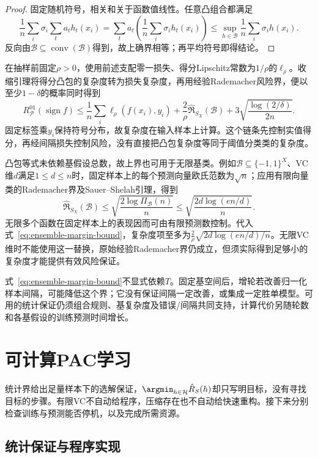 \begin{proof}
固定随机符号，相关和关于函数值线性。任意凸组合都满足
\[
 \frac1n\sum_i\sigma_i\sum_ta_th_t(x_i)
 =\sum_ta_t\left(\frac1n\sum_i\sigma_ih_t(x_i)\right)
 \leq\sup_{h\in\mathcal B}\frac1n\sum_i\sigma_ih(x_i).
\]
反向由$\mathcal B\subseteq\operatorname{conv}(\mathcal B)$得到，故上确界相等；再平均符号即得结论。
\end{proof}

在抽样前固定$\rho>0$，使用前述支配零一损失、得分Lipschitz常数为$1/\rho$的$\ell_\rho$。收缩引理将得分凸包的复杂度转为损失复杂度，再用经验Rademacher风险界，便以至少$1-\delta$的概率同时得到
\begin{equation}
 R_{\mathcal P}^{01}(\operatorname{sign}f)
 \leq\frac1n\sum_i\ell_\rho(f(x_i),y_i)
 +\frac{2}{\rho}\widehat{\mathfrak R}_{S_X}(\mathcal B)
 +3\sqrt{\frac{\log(2/\delta)}{2n}}.
 \label{eq:ensemble-margin-bound}
\end{equation}
固定标签乘$y_i$保持符号分布，故复杂度在输入样本上计算。这个链条先控制实值得分，再经间隔损失控制风险，没有直接把凸包复杂度等同于阈值分类类的复杂度。

凸包等式未依赖基假设总数，故上界也可用于无限基类。例如$\mathcal B\subseteq\{-1,1\}^X$、VC维$d$满足$1\leq d\leq n$时，固定样本上的每个预测向量欧氏范数为$\sqrt n$；应用有限向量类的Rademacher界及Sauer--Shelah引理，得到
\[
 \widehat{\mathfrak R}_{S_X}(\mathcal B)
 \leq\sqrt{\frac{2\log\Pi_{\mathcal B}(n)}{n}}
 \leq\sqrt{\frac{2d\log(en/d)}{n}}.
\]
无限多个函数在固定样本上的表现因而可由有限预测数控制。代入式~\eqref{eq:ensemble-margin-bound}，复杂度项至多为$\frac{2}{\rho}\sqrt{2d\log(en/d)/n}$。无限VC维时不能使用这一替换，原始经验Rademacher界仍成立，但须实际得到足够小的复杂度才能提供有效风险保证。

式~\eqref{eq:ensemble-margin-bound}不显式依赖$T$。固定基空间后，增轮若改善归一化样本间隔，可能降低这个界；它没有保证间隔一定改善，或集成一定胜单模型。可用的统计保证仍须组合规则、基复杂度及错误/间隔共同支持，计算代价另随轮数和各基假设的训练预测时间增长。

\section{可计算PAC学习}
\label{sec:computable-binary-learning}

统计界给出足量样本下的选解保证，$\argmin_{h\in\mathcal H}\hat R_S(h)$却只写明目标，没有寻找目标的步骤。有限VC不自动给程序，压缩存在也不自动给快速重构。接下来分别检查训练与预测能否停机，以及完成所需资源。

\subsection{统计保证与程序实现}

